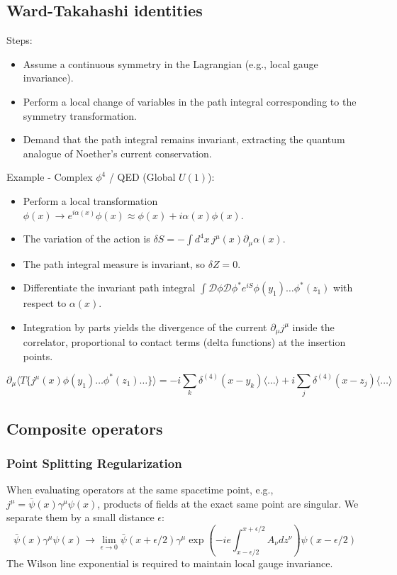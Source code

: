 \documentclass{article}
\begin{document}
\subsection{Ward-Takahashi identities}
Steps:
\begin{itemize}
    \item Assume a continuous symmetry in the Lagrangian (e.g., local gauge invariance).
    \item Perform a local change of variables in the path integral corresponding to the symmetry transformation.
    \item Demand that the path integral remains invariant, extracting the quantum analogue of Noether's current conservation.
\end{itemize}
Example - Complex $\phi^4$ / QED (Global $U(1)$):
\begin{itemize}
    \item Perform a local transformation $\phi(x) \to e^{i\alpha(x)}\phi(x) \approx \phi(x) + i\alpha(x)\phi(x)$.
    \item The variation of the action is $\delta S = -\int d^4x \, j^\mu(x) \partial_\mu \alpha(x)$.
    \item The path integral measure is invariant, so $\delta Z = 0$.
    \item Differentiate the invariant path integral $\int \mathcal{D}\phi \mathcal{D}\phi^* e^{iS} \phi(y_1)\dots\phi^*(z_1)$ with respect to $\alpha(x)$.
    \item Integration by parts yields the divergence of the current $\partial_\mu j^\mu$ inside the correlator, proportional to contact terms (delta functions) at the insertion points.
\end{itemize}
\begin{equation}
    \partial_\mu \langle T\{j^\mu(x) \phi(y_1) \dots \phi^*(z_1) \dots \} \rangle = -i \sum_k \delta^{(4)}(x - y_k) \langle \dots \rangle + i \sum_j \delta^{(4)}(x - z_j) \langle \dots \rangle
\end{equation}
\subsection{Composite operators}
\subsubsection*{Point Splitting Regularization}
When evaluating operators at the same spacetime point, e.g., $j^\mu = \bar{\psi}(x)\gamma^\mu\psi(x)$, products of fields at the exact same point are singular. We separate them by a small distance $\epsilon$:
\begin{equation}
    \bar{\psi}(x)\gamma^\mu\psi(x) \longrightarrow \lim_{\epsilon \to 0} \bar{\psi}(x+\epsilon/2) \gamma^\mu \exp\left( -ie \int_{x-\epsilon/2}^{x+\epsilon/2} A_\nu dz^\nu \right) \psi(x-\epsilon/2)
\end{equation}
The Wilson line exponential is required to maintain local gauge invariance.
\end{document}
